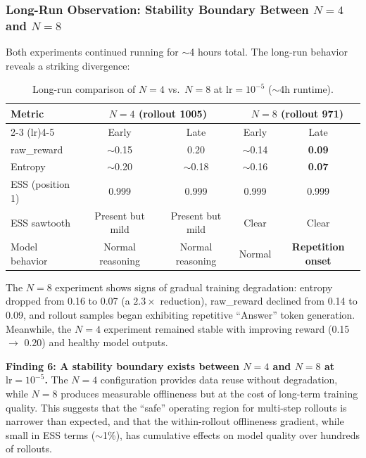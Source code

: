 \documentclass[11pt,a4paper]{article}
\begin{document}
\subsubsection{Long-Run Observation: Stability Boundary Between $N = 4$ and $N = 8$}

Both experiments continued running for $\sim$4 hours total. The long-run
behavior reveals a striking divergence:

\begin{table}[H]
\centering
\caption{Long-run comparison of $N = 4$ vs.\ $N = 8$ at $\mathrm{lr} = 10^{-5}$ ($\sim$4h runtime).}
\label{tab:steps_longrun}
\begin{tabular}{@{}lcccc@{}}
\toprule
\textbf{Metric} & \multicolumn{2}{c}{\textbf{$N = 4$ (rollout 1005)}} & \multicolumn{2}{c}{\textbf{$N = 8$ (rollout 971)}} \\
\cmidrule(lr){2-3} \cmidrule(lr){4-5}
 & Early & Late & Early & Late \\
\midrule
raw\_reward      & $\sim$0.15 & 0.20  & $\sim$0.14 & \textbf{0.09} \\
Entropy          & $\sim$0.20 & $\sim$0.18 & $\sim$0.16 & \textbf{0.07} \\
ESS (position 1) & 0.999 & 0.999 & 0.999 & 0.999 \\
ESS sawtooth     & Present but mild & Present but mild & Clear & Clear \\
Model behavior   & Normal reasoning & Normal reasoning & Normal & \textbf{Repetition onset} \\
\bottomrule
\end{tabular}
\end{table}

The $N = 8$ experiment shows signs of gradual training degradation: entropy
dropped from 0.16 to 0.07 (a $2.3\times$ reduction), raw\_reward declined from
0.14 to 0.09, and rollout samples began exhibiting repetitive ``Answer'' token
generation. Meanwhile, the $N = 4$ experiment remained stable with improving
reward (0.15 $\to$ 0.20) and healthy model outputs.

\begin{keyinsight}
\textbf{Finding 6: A stability boundary exists between $N = 4$ and $N = 8$
at $\mathrm{lr} = 10^{-5}$.} The $N = 4$ configuration provides data reuse
without degradation, while $N = 8$ produces measurable offlineness but at the
cost of long-term training quality. This suggests that the ``safe'' operating
region for multi-step rollouts is narrower than expected, and that the
within-rollout offlineness gradient, while small in ESS terms ($\sim$1\%),
has cumulative effects on model quality over hundreds of rollouts.
\end{keyinsight}
\end{document}
